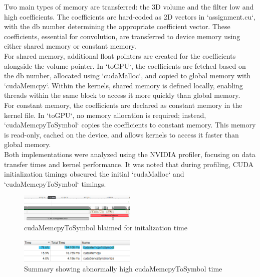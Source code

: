 \documentclass[journal,11pt]{IEEEtran}
\begin{document}
Two main types of memory are transferred: the 3D volume and the filter low and high coefficients. The coefficients are hard-coded as 2D vectors in `assignment.cu`, with the db number determining the appropriate coefficient vector. These coefficients, essential for convolution, are transferred to device memory using either shared memory or constant memory.\\

For shared memory, additional float pointers are created for the coefficients alongside the volume pointer. In `toGPU`, the coefficients are fetched based on the db number, allocated using `cudaMalloc`, and copied to global memory with `cudaMemcpy`. Within the kernels, shared memory is defined locally, enabling threads within the same block to access it more quickly than global memory.\\

For constant memory, the coefficients are declared as constant memory in the kernel file. In `toGPU`, no memory allocation is required; instead, `cudaMemcpyToSymbol` copies the coefficients to constant memory. This memory is read-only, cached on the device, and allows kernels to access it faster than global memory.\\

Both implementations were analyzed using the NVIDIA profiler, focusing on data transfer times and kernel performance. It was noted that during profiling, CUDA initialization timings obscured the initial `cudaMalloc` and `cudaMemcpyToSymbol` timings.
\vspace{-1.2em}\\
\begin{figure}[h]
    \centering
    \includegraphics[width=0.5\textwidth]{assets/blaimed-mem.png}
    \caption{cudaMemcpyToSymbol blaimed for initalization time}
    \label{fig:2}
\end{figure}
\vspace{-0.2em}
\begin{figure}[h]
    \centering
    \includegraphics[width=0.5\textwidth]{assets/blaimed-mem-sum.png}
    \caption{Summary showing abnormally high cudaMemcpyToSymbol time}
    \label{fig:3}
\end{figure}
\end{document}
